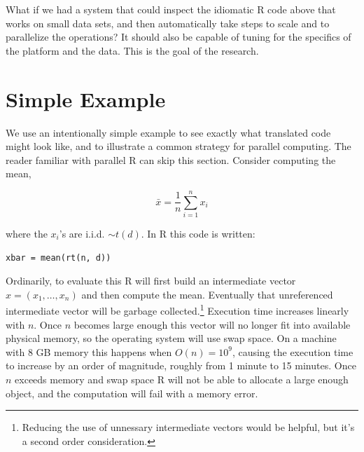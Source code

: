 \documentclass[12pt]{article}
\begin{document}
What if we had a system that could inspect the idiomatic R code above that
works on small data sets, and then automatically take steps to scale and to
parallelize the operations? It should also be capable of tuning for the
specifics of the platform and the data. This is the goal of the research.

\section{Simple Example}


We use an intentionally simple example to see exactly what translated code might look
like, and to illustrate a common strategy for parallel computing. The
reader familiar with parallel R can skip this section.  Consider computing
the mean,

\begin{equation}
    \bar{x} = \frac{1}{n} \sum_{i = 1}^n x_i
\label{eq:mean}
\end{equation}

where the $x_i$'s are
i.i.d. $\sim t(d)$.  In R this code is written:

\begin{verbatim}
xbar = mean(rt(n, d))
\end{verbatim}

Ordinarily, to evaluate this R will first build an intermediate vector $x =
(x_1, \dots, x_n)$ and then compute the mean. Eventually that unreferenced
intermediate vector will be garbage collected.\footnote{Reducing the use of
unnessary intermediate vectors would be helpful, but it's a second order
consideration.} Execution time increases linearly with $n$. Once $n$
becomes large enough this vector will no longer fit into available physical
memory, so the operating system will use swap space. On a machine with 8 GB
memory this happens when $O(n) = 10^9$, causing the execution time to
increase by an order of magnitude, roughly from 1 minute to 15 minutes.
Once $n$ exceeds memory and swap space R will not be able to allocate a
large enough object, and the computation will fail with a memory error.
\end{document}
